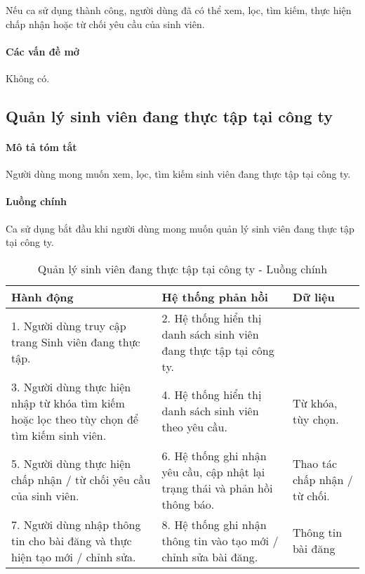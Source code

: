 \documentclass[./../main.tex]{subfiles}
\begin{document}
Nếu ca sử dụng thành công, người dùng đã có thể xem, lọc, tìm kiếm, thực hiện chấp nhận hoặc từ chối yêu cầu của sinh viên.

\paragraph*{Các vấn đề mở}

Không có.

\subsection{Quản lý sinh viên đang thực tập tại công ty}

\paragraph*{Mô tả tóm tắt}

Người dùng mong muốn xem, lọc, tìm kiếm sinh viên đang thực tập tại công ty.

\paragraph*{Luồng chính} Ca sử dụng bắt đầu khi người dùng mong muốn quản lý sinh viên đang thực tập tại công ty.

\begin{table}[H]
  \caption{Quản lý sinh viên đang thực tập tại công ty - Luồng chính}
  \label{tab:partner_manage_students}
  \begin{tabularx}{\textwidth}{|X|X|X|}
    \hline
\textbf{Hành động} & \textbf{Hệ thống phản hồi} & \textbf{Dữ liệu} \\ \hline
1. Người dùng truy cập trang Sinh viên đang thực tập. & 2. Hệ thống hiển thị danh sách sinh viên đang thực tập tại công ty. &  \\ \hline
3. Người dùng thực hiện nhập từ khóa tìm kiếm hoặc lọc theo tùy chọn để tìm kiếm sinh viên. & 4. Hệ thống hiển thị danh sách sinh viên theo yêu cầu. & Từ khóa, tùy chọn. \\ \hline
5. Người dùng thực hiện chấp nhận / từ chối yêu cầu của sinh viên. & 6. Hệ thống ghi nhận yêu cầu, cập nhật lại trạng thái và phản hồi thông báo. & Thao tác chấp nhận / từ chối. \\ \hline
7. Người dùng nhập thông tin cho bài đăng và thực hiện tạo mới / chỉnh sửa. & 8. Hệ thống ghi nhận thông tin vào tạo mới / chỉnh sửa bài đăng. & Thông tin bài đăng \\ \hline
  \end{tabularx}
\end{table}
\end{document}
